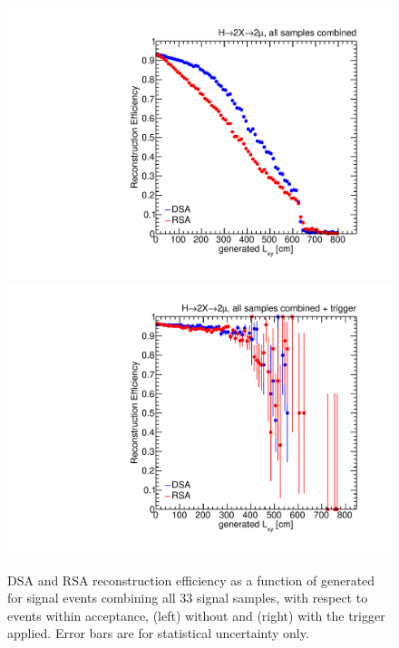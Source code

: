 \begin{figure}[htpb]
  \centering
  \includegraphics[width=\DSquareWidth]{figures/displaced/REFF_Lxy_2Mu2J_Global.pdf}
  \hspace*{-2em}
  \includegraphics[width=\DSquareWidth]{figures/displaced/REFF_Lxy_Trig_2Mu2J_Global.pdf}
  \caption{DSA and RSA reconstruction efficiency as a function of generated \Lxy for \twoMu signal events combining all 33 signal samples, with respect to events within acceptance, (left) without and (right) with the trigger applied. Error bars are for statistical uncertainty only.}
  \label{fig:dd:REFF}
\end{figure}
